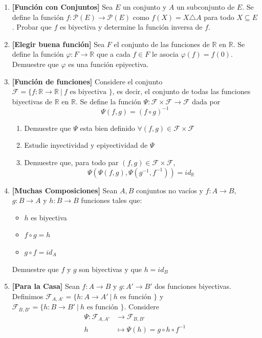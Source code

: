 \documentclass[letterpaper,11pt]{article}
\newcommand{\R}{\mathbb R}
\theoremstyle{plain}
\begin{document}
\begin{enumerate}[\bf P1.]
    \item \textbf{[Función con Conjuntos]} 
    Sea $E$ un conjunto y $A$ un subconjunto de $E$. Se define la función $f:\mathcal{P}(E) \to \mathcal{P}(E) $ como $f(X)=X\triangle A$ para todo $X \subseteq E$. Probar que $f$ es biyectiva y determine la función inversa de $f$.
    
    
    \item \textbf{[Elegir buena función]} Sea $F$ el conjunto de las funciones de $\R$
    en $\R$. Se define la función $\varphi: F \to \R$ que a cada $f \in F$ le asocia $\varphi(f)=f(0)$. Demuestre que $\varphi$ es una función epiyectiva.
    
    \item \textbf{[Función de funciones]} Considere el conjunto $\mathcal{F}=\{f: \R \to \R ~|~ f \text{ es biyectiva }  \}$, es decir, el conjunto de todas las funciones biyectivas de $\R$ en $\R$. Se define la función $\Psi: \mathcal{F} \times \mathcal{F} \to \mathcal{F}$ dada por
    $$ \Psi(f,g)=(f \circ g)^{-1} $$
    \begin{enumerate}
        \item Demuestre que $\Psi$ esta bien definido $\forall (f,g) \in \mathcal{F} \times \mathcal{F}$
        \item Estudie inyectividad y epiyectividad de $\Psi$
        \item Demuestre que, para todo par $(f,g) \in \mathcal{F} \times \mathcal{F}$,
        $$ \Psi(\Psi(f,g),\Psi(g^{-1},f^{-1}))=id_{\R} $$
    \end{enumerate}
    
    \item \textbf{[Muchas Composiciones]} Sean $A,B$ conjuntos no vacíos y $f: A\to B$,  $g: B\to A$ y $h: B\to B$ funciones tales que:
        \begin{multicols}{3}
        \begin{itemize}
            \item $h$ es biyectiva
            \item $f \circ g=h$
            \item $g \circ f=id_{A}$
        \end{itemize}
        \end{multicols}
    Demuestre que $f$ y $g$ son biyectivas y que $h=id_{B}$
    
    \item \textbf{[Para la Casa]} Sean $f:A\to B$ y $g:A'\to B'$ dos funciones biyectivas.
    Definimos $\mathcal{F}_{A,A'}=\{h: A\to A' ~|~ h \text{ es función }\}$ y $\mathcal{F}_{B,B'}=\{h: B\to B' ~|~ h \text{ es función }\}$.
    Considere 
        \begin{align*}
            \Psi \colon \mathcal{F}_{A,A'} &\to \mathcal{F}_{B,B'}\\
            h &\mapsto \Psi(h)=g\circ h \circ f^{-1}
        \end{align*}
        

\end{enumerate}
\end{document}
